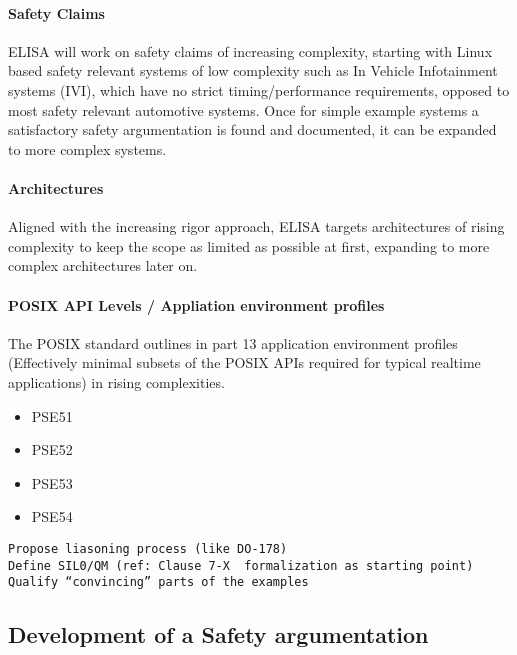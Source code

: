 \documentclass[12pt]{../Common_files/ElisaPaper}
\begin{document}
\paragraph{Safety Claims}
ELISA will work on safety claims of increasing complexity, starting with Linux based safety relevant systems of low complexity such as In Vehicle Infotainment systems (IVI), which have no strict timing/performance requirements, opposed to most safety relevant automotive systems.
Once for simple example systems a satisfactory safety argumentation is found and documented, it can be expanded to more complex systems.
\paragraph{Architectures}
Aligned with the increasing rigor approach, ELISA targets architectures of rising complexity to keep the scope as limited as possible at first, expanding to more complex architectures later on.
\paragraph{POSIX API Levels / Appliation environment profiles}
The POSIX standard  \cite{IEEE1003.1:2010} outlines in part 13 \cite{IEEE1003.13:2003} application environment profiles (Effectively minimal subsets of the POSIX APIs required for typical realtime applications) in rising complexities.
\begin{itemize}
\item PSE51
\item PSE52
\item PSE53
\item PSE54
\end{itemize}

\begin{verbatim}
Propose liasoning process (like DO-178)
Define SIL0/QM (ref: Clause 7-X  formalization as starting point)
Qualify “convincing” parts of the examples  
\end{verbatim}

\subsection{Development of a Safety argumentation}
\end{document}
